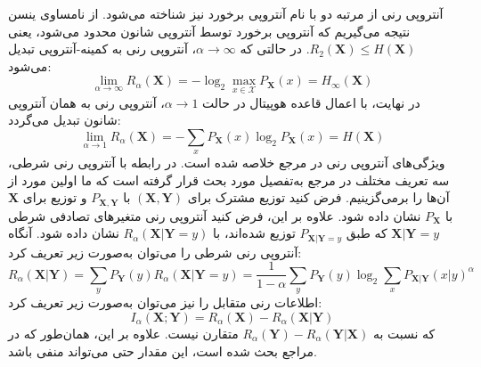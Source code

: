 آنتروپی رنی از مرتبه دو با نام آنتروپی برخورد نیز شناخته می‌شود. از نامساوی ینسن \cite{11} نتیجه می‌گیریم که آنتروپی برخورد توسط آنتروپی شانون محدود می‌شود، یعنی $R_2(\bm{X}) \leq H(\bm{X})$. در حالتی که $\alpha \to \infty$، آنتروپی رنی به کمینه-آنتروپی تبدیل می‌شود:
\begin{equation}
	\lim_{\alpha \to \infty} R_\alpha(\bm{X}) = -\log_2 \max_{x \in \mathcal{X}} P_{\bm{X}}(x) = H_\infty(\bm{X})
	\label{eq:6-61}
\end{equation}
در نهایت، با اعمال قاعده هوپیتال در حالت $\alpha \to 1$، آنتروپی رنی به همان آنتروپی شانون تبدیل می‌گردد:
\begin{equation}
	\lim_{\alpha \to 1} R_\alpha(\bm{X}) = -\sum_x P_{\bm{X}}(x) \log_2 P_{\bm{X}}(x) = H(\bm{X})
	\label{eq:6-62}
\end{equation}
ویژگی‌های آنتروپی رنی در مرجع \cite{115} خلاصه شده است. در رابطه با آنتروپی رنی شرطی، سه تعریف مختلف در مرجع \cite{116} به‌تفصیل مورد بحث قرار گرفته است که ما اولین مورد از آن‌ها را برمی‌گزینیم. فرض کنید توزیع مشترک برای $(\bm{X}, \bm{Y})$ با $P_{\bm{X,Y}}$ و توزیع برای $\bm{X}$ با $P_{\bm{X}}$ نشان داده شود. علاوه بر این، فرض کنید آنتروپی رنی متغیرهای تصادفی شرطی $\bm{X}|\bm{Y}=y$ که طبق $P_{\bm{X}|\bm{Y}=y}$ توزیع شده‌اند، با $R_\alpha(\bm{X}|\bm{Y}=y)$ نشان داده شود. آنگاه آنتروپی رنی شرطی را می‌توان به‌صورت زیر تعریف کرد:
\begin{equation}
	R_\alpha(\bm{X}|\bm{Y}) = \sum_y P_{\bm{Y}}(y) R_\alpha(\bm{X}|\bm{Y}=y) = \frac{1}{1-\alpha} \sum_y P_{\bm{Y}}(y) \log_2 \sum_x P_{\bm{X}|\bm{Y}}(x|y)^\alpha
	\label{eq:6-63}
\end{equation}
اطلاعات رنی متقابل را نیز می‌توان به‌صورت زیر تعریف کرد:
\begin{equation}
	I_\alpha(\bm{X}; \bm{Y}) = R_\alpha(\bm{X}) - R_\alpha(\bm{X}|\bm{Y})
	\label{eq:6-64}
\end{equation}
که نسبت به $R_\alpha(\bm{Y}) - R_\alpha(\bm{Y}|\bm{X})$ متقارن نیست. علاوه بر این، همان‌طور که در مراجع \cite{115, 116} بحث شده است، این مقدار حتی می‌تواند منفی باشد.

